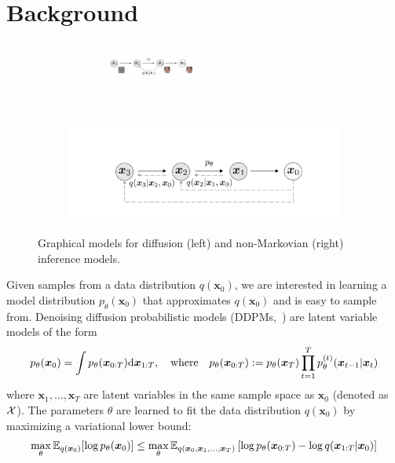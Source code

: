 \section{Background}
\label{sec:background}
\begin{figure}
    \centering
    \begin{subfigure}{0.45\textwidth}
    \includegraphics[width=\textwidth]{figures/diffusion-orig.pdf}
    \end{subfigure}
    ~
    \begin{subfigure}{0.45\textwidth}
    \includegraphics[width=\textwidth]{figures/diffusion-generalized.pdf}
    \end{subfigure}
    \caption{Graphical models for diffusion (left) and non-Markovian (right) inference models.}
    \label{fig:diffusion}
\end{figure}
Given samples from a data distribution $q(\bm{x}_0)$, we are interested in learning a model distribution $p_\theta(\bm{x}_0)$ that approximates $q(\bm{x}_0)$ and is easy to sample from. 
Denoising diffusion probabilistic models (DDPMs,~\citet{sohl-dickstein2015deep,ho2020denoising}) are latent variable models of the form
\begin{align}
    p_\theta(\bm{x}_0) = \int p_\theta(\bm{x}_{0:T}) \mathrm{d} \bm{x}_{1:T}, \quad \text{where} \quad  p_\theta(\bm{x}_{0:T}) := p_\theta(\bm{x}_T) \prod_{t=1}^{T} p^{(t)}_\theta(\bm{x}_{t-1} | \bm{x}_t) \label{eq:gen}
\end{align}
where $\bm{x}_1, \ldots, \bm{x}_T$ are latent variables in the same sample space as $\bm{x}_0$ (denoted as ${\mathcal{X}}$). The parameters $\theta$ are learned to fit the data distribution $q(\bm{x}_0)$ by maximizing a variational lower bound: %
\begin{align}
    \max_\theta {\mathbb{E}}_{q(\bm{x}_0)}[\log p_\theta(\bm{x}_0)] \leq \max_\theta {\mathbb{E}}_{q(\bm{x}_0, \bm{x}_1, \ldots, \bm{x}_T)}\left[\log p_\theta(\bm{x}_{0:T}) - \log q(\bm{x}_{1:T} | \bm{x}_0) \right] \label{eq:elbo}
\end{align}
